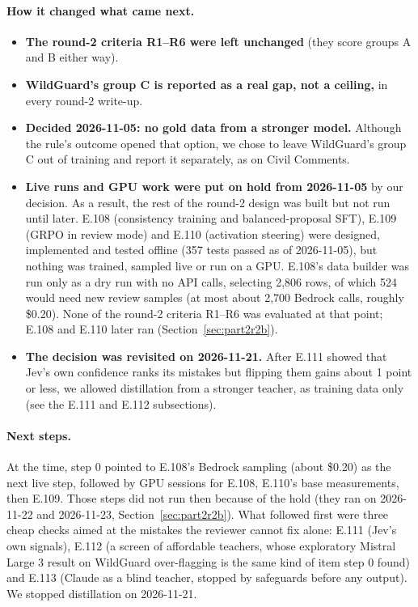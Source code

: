 \documentclass[11pt]{article}
\renewcommand{\_}{\origunderscore\allowbreak}
\begin{document}
\paragraph{How it changed what came next.}
\begin{itemize}[leftmargin=*]
\item \textbf{The round-2 criteria R1--R6 were left unchanged} (they score groups A and B either way).
\item \textbf{WildGuard's group C is reported as a real gap, not a ceiling,} in every round-2 write-up.
\item \textbf{Decided 2026-11-05: no gold data from a stronger model.} Although the rule's outcome opened that option, we chose to leave WildGuard's group C out of training and report it separately, as on Civil Comments.
\item \textbf{Live runs and GPU work were put on hold from 2026-11-05} by our decision. As a result, the rest of the round-2 design was built but not run until later. E.108 (consistency training and balanced-proposal SFT), E.109 (GRPO in review mode) and E.110 (activation steering) were designed, implemented and tested offline (357 tests passed as of 2026-11-05), but nothing was trained, sampled live or run on a GPU. E.108's data builder was run only as a dry run with no API calls, selecting 2{,}806 rows, of which 524 would need new review samples (at most about 2{,}700 Bedrock calls, roughly \$0.20). None of the round-2 criteria R1--R6 was evaluated at that point; E.108 and E.110 later ran (Section~\ref{sec:part2r2b}).
\item \textbf{The decision was revisited on 2026-11-21.} After E.111 showed that Jev's own confidence ranks its mistakes but flipping them gains about 1 point or less, we allowed distillation from a stronger teacher, as training data only (see the E.111 and E.112 subsections).
\end{itemize}

\paragraph{Next steps.}
At the time, step 0 pointed to E.108's Bedrock sampling (about \$0.20) as the next live step, followed by GPU sessions for E.108, E.110's base measurements, then E.109. Those steps did not run then because of the hold (they ran on 2026-11-22 and 2026-11-23, Section~\ref{sec:part2r2b}). What followed first were three cheap checks aimed at the mistakes the reviewer cannot fix alone: E.111 (Jev's own signals), E.112 (a screen of affordable teachers, whose exploratory Mistral Large 3 result on WildGuard over-flagging is the same kind of item step 0 found) and E.113 (Claude as a blind teacher, stopped by safeguards before any output). We stopped distillation on 2026-11-21.
\end{document}
